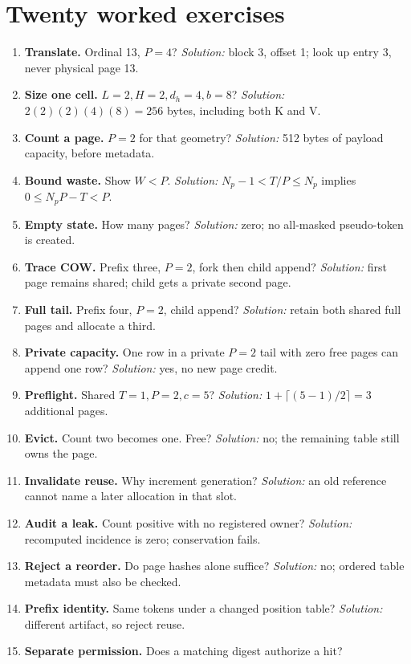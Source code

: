 \section{Twenty worked exercises}
\label{evod36:exercises}
\begin{enumerate}
\item \textbf{Translate.} Ordinal 13, $P=4$? \emph{Solution:} block 3,
offset 1; look up entry 3, never physical page 13.
\item \textbf{Size one cell.} $L=2,H=2,d_h=4,b=8$? \emph{Solution:}
$2(2)(2)(4)(8)=256$ bytes, including both K and V.
\item \textbf{Count a page.} $P=2$ for that geometry? \emph{Solution:}
512 bytes of payload capacity, before metadata.
\item \textbf{Bound waste.} Show $W<P$. \emph{Solution:}
$N_p-1<T/P\le N_p$ implies $0\le N_pP-T<P$.
\item \textbf{Empty state.} How many pages? \emph{Solution:} zero;
no all-masked pseudo-token is created.
\item \textbf{Trace COW.} Prefix three, $P=2$, fork then child append?
\emph{Solution:} first page remains shared; child gets a private second page.
\item \textbf{Full tail.} Prefix four, $P=2$, child append?
\emph{Solution:} retain both shared full pages and allocate a third.
\item \textbf{Private capacity.} One row in a private $P=2$ tail with
zero free pages can append one row? \emph{Solution:} yes, no new page credit.
\item \textbf{Preflight.} Shared $T=1,P=2,c=5$? \emph{Solution:}
$1+\lceil(5-1)/2\rceil=3$ additional pages.
\item \textbf{Evict.} Count two becomes one. Free? \emph{Solution:} no;
the remaining table still owns the page.
\item \textbf{Invalidate reuse.} Why increment generation?
\emph{Solution:} an old reference cannot name a later allocation in that slot.
\item \textbf{Audit a leak.} Count positive with no registered owner?
\emph{Solution:} recomputed incidence is zero; conservation fails.
\item \textbf{Reject a reorder.} Do page hashes alone suffice?
\emph{Solution:} no; ordered table metadata must also be checked.
\item \textbf{Prefix identity.} Same tokens under a changed position table?
\emph{Solution:} different artifact, so reject reuse.
\item \textbf{Separate permission.} Does a matching digest authorize a hit?

\end{enumerate}
